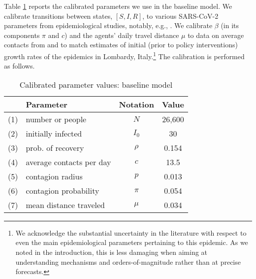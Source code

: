 \documentclass[english,11pt]{article}
\begin{document}
Table \ref{parameters} reports the calibrated parameters we use in the baseline model. We calibrate transitions between states, $[S, I, R]$, to various SARS-CoV-2 parameters from epidemiological studies, notably, e.g., \cite{ferguson2020report}. We calibrate $\beta$ (in its components $\pi$ and $c$) and the agents' daily travel
distance $\mu$ to data on average contacts from \cite{Mossong_2008} and to match estimates of initial (prior to policy interventions) growth rates of the epidemics in Lombardy, Italy.\footnote{We acknowledge the substantial uncertainty in the literature with respect to even the main epidemiological parameters pertaining to this epidemic. As we noted in the introduction, this is less damaging when aiming at understanding mechanisms and orders-of-magnitude rather than at precise forecasts.} The calibration is performed as follows. 
 \begin{table}
	\caption{Calibrated parameter values: baseline model}\label{parameters}  
    \centering
    \begin{tabular}{clcc}
        \toprule
      &  Parameter                       & Notation  & Value\tabularnewline
        \midrule
     (1) &   number or people                & $N$       & 26,600\tabularnewline
     (2) &  initially infected              & $I_0$    & 30 \tabularnewline
     (3) &   prob. of recovery               & $\rho$    & 0.154   \tabularnewline 
      (4) &  average contacts per day                & $c$       & 13.5 \tabularnewline
     (5) &  contagion radius                & $p$       & 0.013\tabularnewline
     (6) &  contagion probability           & $\pi$     & 0.054 \tabularnewline
     (7) &  mean distance traveled          & $\mu$     & 0.034 \tabularnewline
        \bottomrule
    \end{tabular}
\end{table}
\end{document}
